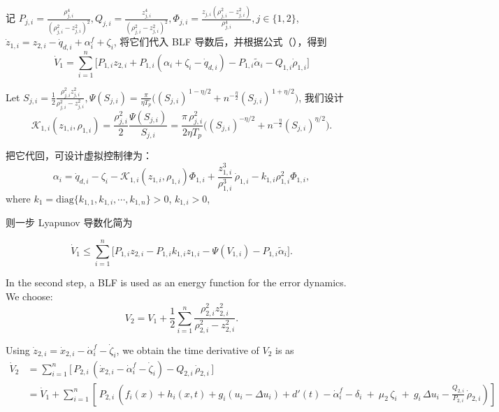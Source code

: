 \documentclass[pdflatex,sn-mathphys-num]{sn-jnl}%
\theoremstyle{thmstyleone}%
\theoremstyle{thmstyletwo}%
\theoremstyle{thmstylethree}%
\begin{document}
记
$
P_{j,i}=\frac{\rho_{j,i}^4}{(\rho_{j,i}^2-z_{j,i}^2)^2},
Q_{j,i}=\frac{ z_{j,i}^4}{(\rho_{j,i}^2-z_{j,i}^2)^2},
\Phi_{j,i}=\frac{z_{j,i}\left(\rho_{j,i}^{2}-z_{j,i}^{2}\right)}{\rho_{j,i}^{4}}, j\in\{1,2\}
$,
$\dot z_{1,i}= z_{2,i}-\dot q_{d,i}+\alpha^{f}_i+\zeta_i$, 将它们代入 BLF 导数后，并根据公式（），得到
$$
\dot V_1=\sum_{i=1}^n\!\Big[P_{1,i} z_{2,i}+P_{1,i}(\alpha_i+\zeta_i-\dot q_{d,i})-P_{1,i}\tilde\alpha_i-Q_{1,i}\dot\rho_{1,i}\Big]
$$

Let ${S_{j,i}}=\frac{1}{2}\frac{\rho_{j,i}^2 z_{j,i}^2}{\rho_{j,i}^2-z_{j,i}^2}, \Psi(S_{j,i})=\frac{\pi}{ \eta T_p}\Big((S_{j,i})^{\,1-\eta/2}+n^{-\frac{\eta}{2} }(S_{j,i})^{\,1+\eta/2}\Big)$, 我们设计
$$
\mathcal{K}_{1,i}(z_{1,i},\rho_{1,i})
=\frac{\rho_{j,i}^2}{2}\frac{\Psi(S_{j,i})}{S_{j,i}}
=\frac{\pi\,\rho_{j,i}^2}{2\eta T_p}\Big((S_{j,i})^{-\eta/2}+n^{-\frac{\eta}{2} }(S_{j,i})^{\eta/2}\Big).
$$

把它代回，可设计虚拟控制律为：
\begin{equation}\label{eq:25}
\alpha_i = \dot q_{d,i}-\zeta_i
-\mathcal{K}_{1,i}(z_{1,i},\rho_{1,i})\Phi_{1,i}
+\frac{z_{1,i}^3}{\rho_{1,i}^3}\,\dot\rho_{1,i}-k_{1,i} \rho_{1,i}^2 \Phi_{1,i},
\end{equation}
where $k_1=\mathrm{diag}\{k_{1,1},k_{1,i},\cdots,k_{1,n}\}>0$, $k_{1,i}>0$,

则一步 Lyapunov 导数化简为

$$
\dot V_1
\le \sum_{i=1}^n \Big[ P_{1,i} z_{2,i}
-P_{1,i} k_{1,i}z_{1,i}-\Psi(V_{1,i})-P_{1,i}\tilde\alpha_i
\Big].
$$


In the second step, a BLF is used as an energy function for the error dynamics. We choose:
\begin{equation}\label{eq:25}
	V_2= V_1+\frac{1}{2}\sum_{i=1}^{n} \frac{\rho_{2,i}^2 z_{2,i}^2}{\rho_{2,i}^2-z_{2,i}^2}. 
\end{equation}


Using $\dot z_{2,i}=\dot x_{2,i}-\dot\alpha_i^{f}-\dot\zeta_i$, we obtain the time derivative of $V_2$ is as
\begin{equation}
	\begin{aligned}
		\dot V_2& = \sum_{i=1}^n \Big[\,P_{2,i}\,(\dot x_{2,i}-\dot\alpha_i^{f}-\dot\zeta_i)-Q_{2,i}\,\dot\rho_{2,i}\,\Big]\\
		&
		 = \dot V_1+\sum_{i=1}^n \left[\,P_{2,i}\,\left(f_i(x)+h_i(x,t)+g_i(u_i-\Delta u_i)+d'(t)-\dot\alpha_i^{f}-\delta_i\ +\ \mu_2\,\zeta_i\ +\ g_i\,\Delta u_i-\frac{Q_{2,i}}{P_{2,i}}\,\dot\rho_{2,i} \right)\right]
	\end{aligned}
\end{equation}
\end{document}
